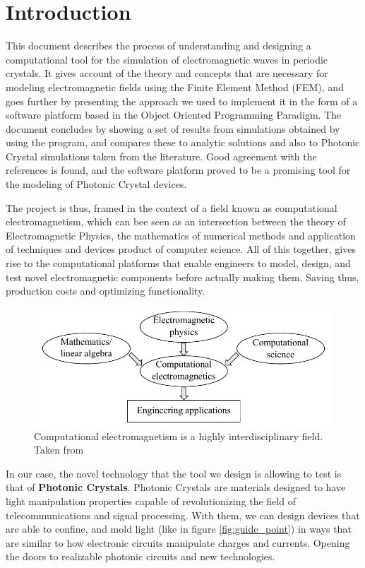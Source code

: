 \cleardoublepage {}
{}
\chapter*{Introduction}

This document describes the process of understanding and designing a computational tool for the simulation of electromagnetic waves in periodic crystals. It gives account of the  theory and concepts that are necessary for modeling electromagnetic fields using the Finite Element Method (FEM), and goes further by presenting the approach we used to implement it in the form of a software platform based in the Object Oriented Programming Paradigm. The document concludes by showing a set of results from simulations obtained by using the program, and compares these to analytic solutions and also to Photonic Crystal simulations taken from the literature. Good agreement with the references is found, and the software platform proved to be a promising tool for the modeling of Photonic Crystal devices.

The project is thus, framed in the context of a field known as computational electromagnetism, which can bee seen as an intersection between the theory of Electromagnetic Physics, the mathematics of numerical methods and application of techniques and devices product of computer science. All of this together, gives rise to the computational platforms that enable engineers to model, design, and test novel electromagnetic components before actually making them. Saving thus, production costs and optimizing functionality.  
\begin{figure}
\centering
\includegraphics[scale=1]{./img/interdisciplinary.pdf}
\caption{Computational electromagnetism is a highly interdisciplinary field. Taken from \cite{Jin2010}}
\label{fig:computational}
\end{figure}
In our case, the novel technology that the tool we design is allowing to test is that of \textbf{Photonic Crystals}. Photonic Crystals are materials designed to have light manipulation properties capable of revolutionizing the field of telecommunications and signal processing. With them, we can design devices that are able to confine, and mold light (like in figure \ref{fig:guide_point}) in ways that are similar to how electronic circuits manipulate charges and currents.  Opening the doors to realizable photonic circuits and new technologies.

